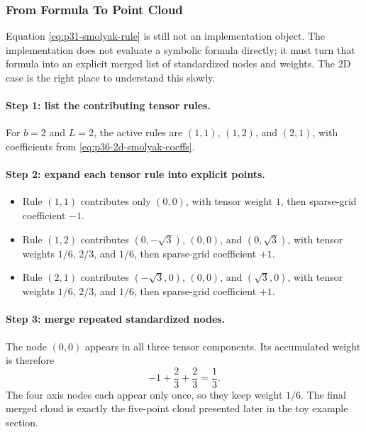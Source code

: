 \documentclass[11pt]{article}
\numberwithin{equation}{section}
\begin{document}
\subsubsection{From Formula To Point Cloud}
\label{subsec:p32-cloud-construction}

Equation \eqref{eq:p31-smolyak-rule} is still not an implementation object.
The implementation does not evaluate a symbolic formula directly; it must turn
that formula into an explicit merged list of standardized nodes and weights.
The 2D case is the right place to understand this slowly.

\paragraph{Step 1: list the contributing tensor rules.}
For \(b=2\) and \(L=2\), the active rules are \((1,1)\), \((1,2)\), and
\((2,1)\), with coefficients from \eqref{eq:p36-2d-smolyak-coeffs}.

\paragraph{Step 2: expand each tensor rule into explicit points.}
\begin{itemize}[leftmargin=0.28in]
  \item Rule \((1,1)\) contributes only \((0,0)\), with tensor weight \(1\),
  then sparse-grid coefficient \(-1\).
  \item Rule \((1,2)\) contributes
  \((0,-\sqrt3)\), \((0,0)\), and \((0,\sqrt3)\), with tensor weights
  \(1/6\), \(2/3\), and \(1/6\), then sparse-grid coefficient \(+1\).
  \item Rule \((2,1)\) contributes
  \((-\sqrt3,0)\), \((0,0)\), and \((\sqrt3,0)\), with tensor weights
  \(1/6\), \(2/3\), and \(1/6\), then sparse-grid coefficient \(+1\).
\end{itemize}

\paragraph{Step 3: merge repeated standardized nodes.}
The node \((0,0)\) appears in all three tensor components.  Its accumulated
weight is therefore
\begin{equation}
  -1 + \frac23 + \frac23 = \frac13.
  \label{eq:p36-origin-merge}
\end{equation}
The four axis nodes each appear only once, so they keep weight \(1/6\).
The final merged cloud is exactly the five-point cloud presented later in the toy
example section.
\end{document}

